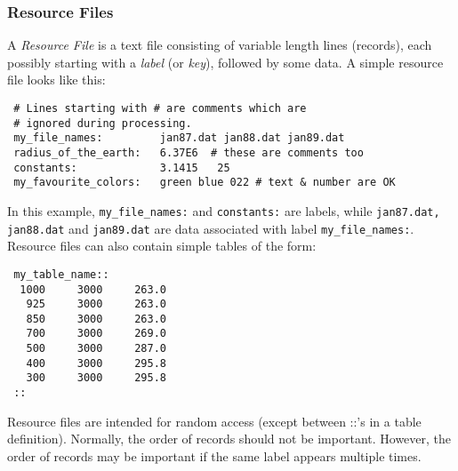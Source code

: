 
 \subsubsection{Resource Files}

      A {\em Resource File} is a text file consisting of variable
     length lines (records), each possibly starting with a {\em label}
     (or {\em key}), followed by some data. A simple resource file 
     looks like this:

 \begin{verbatim}
 # Lines starting with # are comments which are
 # ignored during processing.
 my_file_names:         jan87.dat jan88.dat jan89.dat
 radius_of_the_earth:   6.37E6  # these are comments too
 constants:             3.1415   25
 my_favourite_colors:   green blue 022 # text & number are OK
 \end{verbatim}

    In this example, {\tt my\_file\_names:} and {\tt constants:}
    are labels, while {\tt jan87.dat, jan88.dat} and {\tt jan89.dat} are
    data associated with label {\tt my\_file\_names:}.
    Resource files can also contain simple tables of the form:

 \begin{verbatim}
 my_table_name::
  1000     3000     263.0   
   925     3000     263.0
   850     3000     263.0
   700     3000     269.0
   500     3000     287.0
   400     3000     295.8
   300     3000     295.8    
 ::
 \end{verbatim}

 Resource files are intended for random access (except between ::'s in a 
 table definition). Normally, the order of records should not be important. 
 However, the order of records may be important if the same label appears 
 multiple times.



